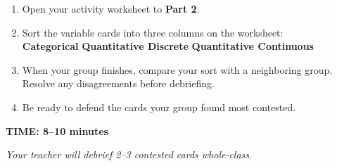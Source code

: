 \documentclass[aspectratio=169, 11pt]{beamer}
\begin{document}
{
\begin{frame}[t, plain]
  \vspace{1.1cm}\par
  \hspace{0.55cm}%
  \begin{minipage}{0.9\textwidth}
    \vspace{0.4em}
    \small

    \begin{enumerate}
      \setlength{\itemsep}{0.5em}\setlength{\topsep}{0em}
      \item Open your activity worksheet to \textbf{Part 2}.
      \item Sort the variable cards into three columns on the worksheet:\\[4pt]
        \hspace{0.8cm}
        \textbf{\color{greenacc}Categorical} \hspace{1.2cm}
        \textbf{\color{navy}Quantitative Discrete} \hspace{1.2cm}
        \textbf{\color{redacc}Quantitative Continuous}
      \item When your group finishes, compare your sort with a neighboring group.
            Resolve any disagreements before debriefing.
      \item Be ready to defend the cards your group found most contested.
    \end{enumerate}

    \vspace{0.7cm}
    {\color{redacc}\bfseries\small TIME: 8--10 minutes}

    \vspace{0.3cm}
    \textcolor{slate}{\small\itshape
      Your teacher will debrief 2--3 contested cards whole-class.}
  \end{minipage}
\end{frame}
}
\end{document}
